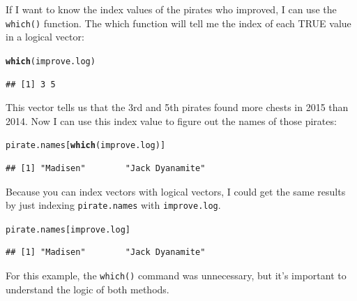 \documentclass{tufte-book}\usepackage[]{graphicx}\usepackage[]{color}
\makeatletter
\newcommand{\hlstd}[1]{\textcolor[rgb]{0.345,0.345,0.345}{#1}}%
\newcommand{\hlkwd}[1]{\textcolor[rgb]{0.737,0.353,0.396}{\textbf{#1}}}%
\newenvironment{kframe}{%
 \def\at@end@of@kframe{}%
 \ifinner\ifhmode%
  \def\at@end@of@kframe{\end{minipage}}%
  \begin{minipage}{\columnwidth}%
 \fi\fi%
 \def\FrameCommand##1{\hskip\@totalleftmargin \hskip-\fboxsep
 \colorbox{shadecolor}{##1}\hskip-\fboxsep
     \hskip-\linewidth \hskip-\@totalleftmargin \hskip\columnwidth}%
 \MakeFramed {\advance\hsize-\width
   \@totalleftmargin\z@ \linewidth\hsize
   \@setminipage}}%
 {\par\unskip\endMakeFramed%
 \at@end@of@kframe}
\newenvironment{knitrout}{}{} %
\makeatother
\begin{document}
If I want to know the index values of the pirates who improved, I can use the \texttt{which()} function. The which function will tell me the index of each TRUE value in a logical vector:


\begin{knitrout}
\color{fgcolor}\begin{kframe}
\begin{alltt}
\hlkwd{which}\hlstd{(improve.log)}
\end{alltt}
\begin{verbatim}
## [1] 3 5
\end{verbatim}
\end{kframe}
\end{knitrout}


This vector tells us that the 3rd and 5th pirates found more chests in 2015 than 2014. Now I can use this index value to figure out the names of those pirates:


\begin{knitrout}
\color{fgcolor}\begin{kframe}
\begin{alltt}
\hlstd{pirate.names[}\hlkwd{which}\hlstd{(improve.log)]}
\end{alltt}
\begin{verbatim}
## [1] "Madisen"        "Jack Dyanamite"
\end{verbatim}
\end{kframe}
\end{knitrout}



Because you can index vectors with logical vectors, I could get the same results by just indexing \texttt{pirate.names} with \texttt{improve.log}.


\begin{knitrout}
\color{fgcolor}\begin{kframe}
\begin{alltt}
\hlstd{pirate.names[improve.log]}
\end{alltt}
\begin{verbatim}
## [1] "Madisen"        "Jack Dyanamite"
\end{verbatim}
\end{kframe}
\end{knitrout}

For this example, the \texttt{which()} command was unnecessary, but it's important to understand the logic of both methods.
\end{document}

